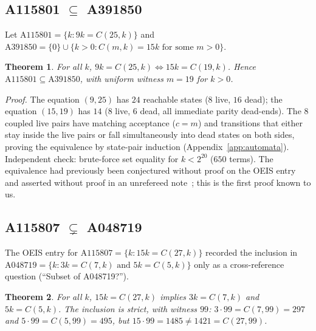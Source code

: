 \documentclass[11pt]{article}
\newtheorem{theorem}{Theorem}[section]
\newcommand{\clmul}{C} %
\begin{document}
\subsection{A115801 $\subseteq$ A391850}
\label{sec:a115801}
Let $\mathrm{A115801} = \{k : 9k = \clmul(25,k)\}$ and
$\mathrm{A391850} = \{0\} \cup \{k > 0 : \clmul(m,k) = 15k \text{ for
some } m > 0\}$.

\begin{theorem}
For all $k$, $9k = \clmul(25,k) \iff 15k = \clmul(19,k)$. Hence
$\mathrm{A115801} \subseteq \mathrm{A391850}$, with uniform witness
$m = 19$ for $k > 0$.
\end{theorem}

\emph{Proof.} The equation $(9,25)$ has $24$ reachable states
($8$ live, $16$ dead); the equation $(15,19)$ has $14$ ($8$ live,
$6$ dead, all immediate parity dead-ends). The 8 coupled live pairs have matching acceptance ($c = m$) and transitions that either stay inside the live pairs or fall simultaneously into dead states on both sides, proving the equivalence by state-pair induction (Appendix~\ref{app:automata}).
Independent check: brute-force set equality for $k < 2^{20}$ ($650$
terms). The equivalence had previously been conjectured without proof on the OEIS entry~\cite{oeisA115801} and asserted without proof in an unrefereed note~\cite{A115801Note}; this is the first proof known to us.

\subsection{A115807 $\subsetneq$ A048719}
\label{sec:a115807}
The OEIS entry for $\mathrm{A115807} = \{k : 15k = \clmul(27,k)\}$
recorded the inclusion in $\mathrm{A048719} = \{k : 3k = \clmul(7,k)
\text{ and } 5k = \clmul(5,k)\}$ only as a cross-reference question
(``Subset of A048719?'').

\begin{theorem}
For all $k$, $15k = \clmul(27,k)$ implies $3k = \clmul(7,k)$ and
$5k = \clmul(5,k)$. The inclusion is strict, with witness $99$:
$3 \cdot 99 = \clmul(7,99) = 297$ and $5 \cdot 99 = \clmul(5,99) =
495$, but $15 \cdot 99 = 1485 \ne 1421 = \clmul(27,99)$.
\end{theorem}
\end{document}
